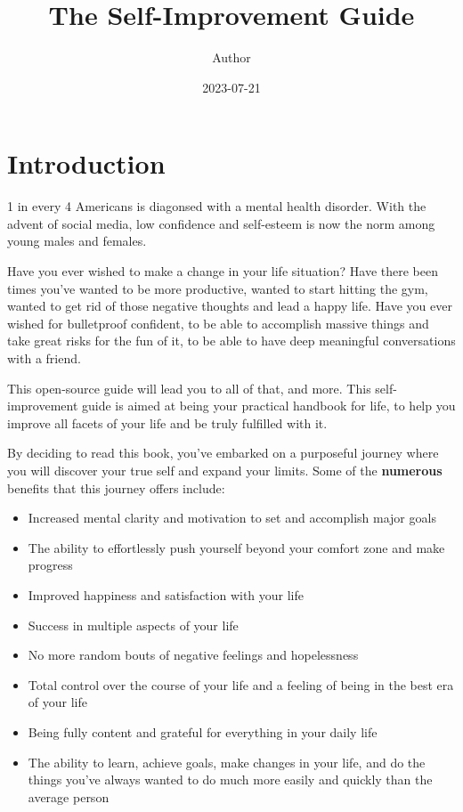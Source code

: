 \documentclass[
]{book}
\title{The Self-Improvement Guide}
\author{Author}
\date{2023-07-21}
\providecommand{\tightlist}{%
  \setlength{\itemsep}{0pt}\setlength{\parskip}{0pt}}
\begin{document}
\maketitle

{
\setcounter{tocdepth}{1}
\tableofcontents
}
\hypertarget{introduction}{%
\chapter{Introduction}\label{introduction}}

1 in every 4 Americans is diagonsed with a mental health disorder. With the advent of social media, low confidence and self-esteem is now the norm among young males and females.

Have you ever wished to make a change in your life situation? Have there been times you've wanted to be more productive, wanted to start hitting the gym, wanted to get rid of those negative thoughts and lead a happy life. Have you ever wished for bulletproof confident, to be able to accomplish massive things and take great risks for the fun of it, to be able to have deep meaningful conversations with a friend.

This open-source guide will lead you to all of that, and more. This self-improvement guide is aimed at being your practical handbook for life, to help you improve all facets of your life and be truly fulfilled with it.

By deciding to read this book, you've embarked on a purposeful journey where you will discover your true self and expand your limits. Some of the \textbf{numerous} benefits that this journey offers include:

\begin{itemize}
\tightlist
\item
  Increased mental clarity and motivation to set and accomplish major goals
\item
  The ability to effortlessly push yourself beyond your comfort zone and make progress
\item
  Improved happiness and satisfaction with your life
\item
  Success in multiple aspects of your life
\item
  No more random bouts of negative feelings and hopelessness
\item
  Total control over the course of your life and a feeling of being in the best era of your life
\item
  Being fully content and grateful for everything in your daily life
\item
  The ability to learn, achieve goals, make changes in your life, and do the things you've always wanted to do much more easily and quickly than the average person
\end{itemize}
\end{document}
